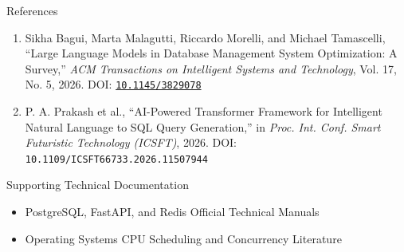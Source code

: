 \documentclass[aspectratio=169,11pt]{beamer}
\begin{document}

\begin{frame}{References}

\begin{enumerate}\itemsep3pt
\scriptsize
\item Sikha Bagui, Marta Malagutti, Riccardo Morelli, and Michael Tamascelli,
``Large Language Models in Database Management System Optimization: A Survey,''
\textit{ACM Transactions on Intelligent Systems and Technology}, Vol. 17, No. 5, 2026.
DOI: \href{https://doi.org/10.1145/3829078}{\texttt{10.1145/3829078}}

\item P. A. Prakash et al.,
``AI-Powered Transformer Framework for Intelligent Natural Language to SQL Query Generation,''
in \textit{Proc. Int. Conf. Smart Futuristic Technology (ICSFT)}, 2026.
DOI: \texttt{10.1109/ICSFT66733.2026.11507944}
\end{enumerate}

\vspace{2mm}

\begin{block}{Supporting Technical Documentation}
\scriptsize
\begin{itemize}\itemsep1pt
\item[\tiny$\bullet$] PostgreSQL, FastAPI, and Redis Official Technical Manuals
\item[\tiny$\bullet$] Operating Systems CPU Scheduling and Concurrency Literature
\end{itemize}
\end{block}

\end{frame}


\end{document}
